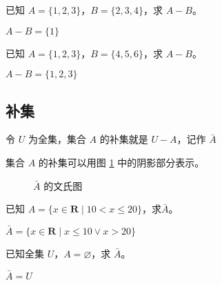 \begin{collections}
    \begin{example}
        已知 $A = \{ 1, 2, 3 \}$，$B = \{2, 3, 4\}$，求 $A - B$。
    \end{example}
    \begin{solution}
        $A-B = \{1\}$
    \end{solution}

    \spare

    \begin{example}
        已知 $A = \{1, 2, 3\}$，$B = \{4, 5, 6\}$，求 $A - B$。
    \end{example}
    \begin{solution}
        $A - B = \{1, 2, 3\}$
    \end{solution}
\end{collections}

\subsection{补集}
\begin{definition}[集合的补集]
    令 $U$ 为全集，集合 $A$ 的补集就是 $U-A$，记作 $\bar{A}$
\end{definition}

集合 $A$ 的补集可以用图 \ref{fig:补集文氏图} 中的阴影部分表示。
\begin{figure}[htbp!]
    \centering
    \caption{$\bar{A}$ 的文氏图}
    \label{fig:补集文氏图}
\end{figure}

\begin{collections}
    \begin{example}
        已知 $A = \{x \in \symbf{R} \mid 10 < x \leq 20\}$，求$\bar{A}$。
    \end{example}
    \begin{solution}
        $\bar{A} = \{x \in \symbf{R} \mid x \leq 10 \lor x > 20\}$
    \end{solution}

    \spare

    \begin{example}
        已知全集 $U$，$A = \varnothing$，求 $\bar{A}$。
    \end{example}
    \begin{solution}
        $\bar{A} = U$
    \end{solution}
\end{collections}

